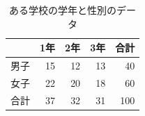 \begin{table}[ht]
	\centering
	\caption{ある学校の学年と性別のデータ}
	\begin{tabular}{rrrrr}
		\hline
		   & 1年 & 2年 & 3年 & 合計  \\
		\hline
		男子 & 15 & 12 & 13 & 40  \\
		女子 & 22 & 20 & 18 & 60  \\\hline
		合計 & 37 & 32 & 31 & 100 \\\hline
	\end{tabular}
	\label{tbl::24_02}
\end{table}
